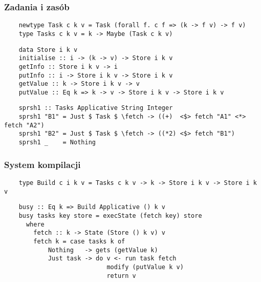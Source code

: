 \lstset{style=haskell-style}

\begin{frame}[fragile]
  \frametitle{Zadania i zasób}

  \begin{lstlisting}
    newtype Task c k v = Task (forall f. c f => (k -> f v) -> f v)
    type Tasks c k v = k -> Maybe (Task c k v)
  \end{lstlisting}

  \begin{lstlisting}
    data Store i k v
    initialise :: i -> (k -> v) -> Store i k v
    getInfo :: Store i k v -> i
    putInfo :: i -> Store i k v -> Store i k v
    getValue :: k -> Store i k v -> v
    putValue :: Eq k => k -> v -> Store i k v -> Store i k v
  \end{lstlisting}

  \begin{example}
  \begin{lstlisting}
    sprsh1 :: Tasks Applicative String Integer
    sprsh1 "B1" = Just $ Task $ \fetch -> ((+)  <$> fetch "A1" <*> fetch "A2")
    sprsh1 "B2" = Just $ Task $ \fetch -> ((*2) <$> fetch "B1")
    sprsh1 _    = Nothing
  \end{lstlisting}
  \vspace{-1em}
  \end{example}
  
\end{frame}

\begin{frame}[fragile]
  \frametitle{System kompilacji}
  \begin{lstlisting}
    type Build c i k v = Tasks c k v -> k -> Store i k v -> Store i k v
  \end{lstlisting}

  \begin{example}
  \begin{lstlisting}
    busy :: Eq k => Build Applicative () k v
    busy tasks key store = execState (fetch key) store
      where
        fetch :: k -> State (Store () k v) v
        fetch k = case tasks k of
            Nothing   -> gets (getValue k)
            Just task -> do v <- run task fetch
                            modify (putValue k v)
                            return v
  \end{lstlisting}
  \vspace{-1em}
  \end{example}
\end{frame}

